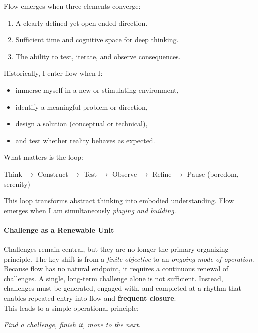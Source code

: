 Flow emerges when three elements converge:

\begin{enumerate}
	\item A clearly defined yet open-ended direction.
	\item Sufficient time and cognitive space for deep thinking.
	\item The ability to test, iterate, and observe consequences.
\end{enumerate}

Historically, I enter flow when I:
\begin{itemize}
	\item immerse myself in a new or stimulating environment,
	\item identify a meaningful problem or direction,
	\item design a solution (conceptual or technical),
	\item and test whether reality behaves as expected.
\end{itemize}

What matters is the loop:

\begin{center}
	Think $\rightarrow$ Construct $\rightarrow$ Test $\rightarrow$ Observe $\rightarrow$ Refine $\rightarrow$ Pause (boredom, serenity)
\end{center}

This loop transforms abstract thinking into embodied understanding. Flow emerges when I am simultaneously \textit{playing and building}.

\paragraph{Challenge as a Renewable Unit}

Challenges remain central, but they are no longer the primary organizing principle. The key shift is from a \textit{finite objective} to an \textit{ongoing mode of operation}.\\

Because flow has no natural endpoint, it requires a continuous renewal of challenges. A single, long-term challenge alone is not sufficient. Instead, challenges must be generated, engaged with, and completed at a rhythm that enables repeated entry into flow and \textbf{frequent closure}.\\

This leads to a simple operational principle:

\begin{center}
	\textit{Find a challenge, finish it, move to the next.}
\end{center}


